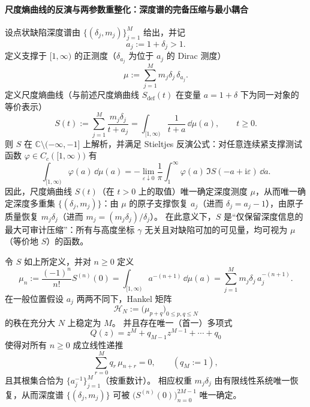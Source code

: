 \paragraph{尺度熵曲线的反演与两参数重整化：深度谱的完备压缩与最小耦合}

\begin{proposition}
设点状缺陷深度谱由 \(\{(\delta_j,m_j)\}_{j=1}^{M}\) 给出，并记
\[
a_j:=1+\delta_j>1.
\]
定义支撑于 \([1,\infty)\) 的正测度（\(\delta_{a_j}\) 为位于 \(a_j\) 的 Dirac 测度）
\[
\mu:=\sum_{j=1}^{M} m_j\delta_j\,\delta_{a_j}.
\]
定义尺度熵曲线（与前述尺度熵曲线 \(S_{\mathrm{def}}(t)\) 在变量 \(a=1+\delta\) 下为同一对象的等价表示）
\[
S(t):=\sum_{j=1}^{M}\frac{m_j\delta_j}{t+a_j}
=\int_{[1,\infty)}\frac{1}{t+a}\,\dd\mu(a),
\qquad t\ge 0.
\]
则 \(S\) 在 \(\mathbb{C}\setminus(-\infty,-1]\) 上解析，并满足 Stieltjes 反演公式：对任意连续紧支撑测试函数 \(\varphi\in C_c([1,\infty))\) 有
\[
\int_{[1,\infty)}\varphi(a)\,\dd\mu(a)
=-\lim_{\varepsilon\downarrow0}\frac{1}{\pi}\int_{1}^{\infty}\varphi(a)\,\Im S(-a+\mathrm{i}\varepsilon)\,\dd a.
\]
因此，尺度熵曲线 \(S(t)\)（在 \(t>0\) 上的取值）唯一确定深度测度 \(\mu\)，从而唯一确定深度多重集 \(\{(\delta_j,m_j)\}\)：由 \(\mu\) 的原子支撑恢复 \(a_j\)（进而 \(\delta_j=a_j-1\)），由原子质量恢复 \(m_j\delta_j\)（进而 \(m_j=(m_j\delta_j)/\delta_j\)）。
在此意义下，\(S\) 是“仅保留深度信息的最大可审计压缩”：所有与高度坐标 \(\gamma\) 无关且对缺陷可加的可见量，均可视为 \(\mu\)（等价地 \(S\)）的函数。
 \end{proposition}

\begin{proposition}
令 \(S\) 如上所定义，并对 \(n\ge0\) 定义
\[
\mu_n:=\frac{(-1)^n}{n!}S^{(n)}(0)
=\int_{[1,\infty)}a^{-(n+1)}\,\dd\mu(a)
=\sum_{j=1}^{M}m_j\delta_j\,a_j^{-(n+1)}.
\]
在一般位置假设 \(a_j\) 两两不同下，Hankel 矩阵
\[
\mathcal{H}_N:=\bigl(\mu_{p+q}\bigr)_{0\le p,q\le N}
\]
的秩在充分大 \(N\) 上稳定为 \(M\)。
并且存在唯一（首一）多项式
\[
Q(z)=z^{M}+q_{M-1}z^{M-1}+\cdots+q_0
\]
使得对所有 \(n\ge0\) 成立线性递推
\[
\sum_{r=0}^{M}q_r\,\mu_{n+r}=0,\qquad (q_M:=1),
\]
且其根集合恰为 \(\{a_j^{-1}\}_{j=1}^{M}\)（按重数计）。
相应权重 \(m_j\delta_j\) 由有限线性系统唯一恢复，从而深度谱 \(\{(\delta_j,m_j)\}\) 可被 \(\bigl(S^{(n)}(0)\bigr)_{n=0}^{2M-1}\) 唯一确定。
\end{proposition}


